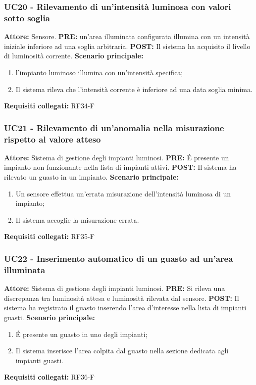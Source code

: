 \documentclass[a4paper, 12pt]{article}
\begin{document}
\subsubsection{UC20 - Rilevamento di un'intensità luminosa con valori sotto soglia}
\textbf{Attore:} Sensore.\newline
\textbf{PRE:} un'area illuminata configurata illumina con un intensità iniziale inferiore ad una soglia arbitraria.\newline
\textbf{POST:} Il sistema ha acquisito il livello di luminosità corrente. \newline
\textbf{Scenario principale:}
\begin{enumerate}
    \item l'impianto luminoso illumina con un'intensità specifica;
    \item Il sistema rileva che l'intensità corrente è inferiore ad una data soglia minima.
\end{enumerate}
\textbf{Requisiti collegati:} RF34-F\newline

\subsubsection{UC21 - Rilevamento di un'anomalia nella misurazione rispetto al valore atteso}
\textbf{Attore:} Sistema di gestione degli impianti luminosi.\newline
\textbf{PRE:} \'E presente un impianto non funzionante nella lista di impianti attivi.\newline
\textbf{POST:} Il sistema ha rilevato un guasto in un impianto. \newline
\textbf{Scenario principale:}
\begin{enumerate}
    \item Un sensore effettua un'errata misurazione dell'intensità luminosa di un impianto;
    \item Il sistema accoglie la misurazione errata.
\end{enumerate}
\textbf{Requisiti collegati:} RF35-F\newline

\subsubsection{UC22 - Inserimento automatico di un guasto ad un'area illuminata}
\textbf{Attore:} Sistema di gestione degli impianti luminosi.\newline
\textbf{PRE:} Si rileva una discrepanza tra luminosità attesa e luminosità rilevata dal sensore.\newline
\textbf{POST:} Il sistema ha registrato il guasto inserendo l'area d'interesse nella lista di impianti guasti. \newline
\textbf{Scenario principale:}
\begin{enumerate}
    \item \'E presente un guasto in uno degli impianti;
    \item Il sistema inserisce l'area colpita dal guasto nella sezione dedicata agli impianti guasti.
\end{enumerate}
\textbf{Requisiti collegati:} RF36-F\newline
\end{document}
